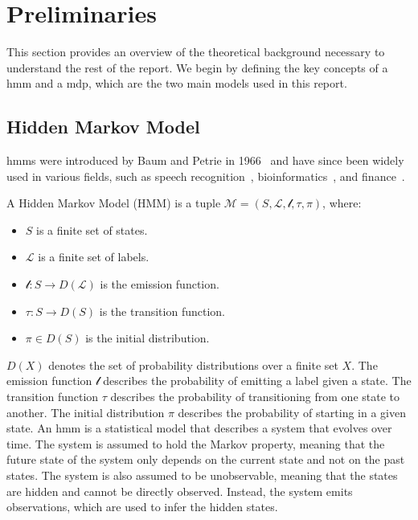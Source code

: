 \section{Preliminaries}\label{sec:preliminaries}
This section provides an overview of the theoretical background necessary to understand the rest of the report. 
We begin by defining the key concepts of a \gls{hmm} and a \gls{mdp}, which are the two main models used in this report.


\subsection{Hidden Markov Model}\label{subsec:hmm}
\glspl{hmm} were introduced by Baum and Petrie in 1966~\cite{NOTFOUND} and have since been widely used in various fields, such as speech recognition~\cite{NOTFOUND}, bioinformatics~\cite{NOTFOUND}, and finance~\cite{NOTFOUND}.
\begin{definition}
    A Hidden Markov Model (HMM) is a tuple $\mathcal{M} = (S, \mathcal{L}, \mathscr{l}, \tau,  \pi)$, where:
    \begin{itemize}
        \item $S$ is a finite set of states.
        \item $\mathcal{L}$ is a finite set of labels.
        \item $\mathscr{l}: S \rightarrow D(\mathcal{L})$ is the emission function.
        \item $\tau: S \rightarrow D(S)$ is the transition function.
        \item $\pi \in D(S)$ is the initial distribution.
    \end{itemize}
\end{definition}

$D(X)$ denotes the set of probability distributions over a  finite set $X$.
The emission function $\mathscr{l}$ describes the probability of emitting a label given a state.
The transition function $\tau$ describes the probability of transitioning from one state to another.
The initial distribution $\pi$ describes the probability of starting in a given state.
An \gls{hmm} is a statistical model that describes a system that evolves over time.
The system is assumed to hold the Markov property, meaning that the future state of the system only depends on the current state and not on the past states.
The system is also assumed to be unobservable, meaning that the states are hidden and cannot be directly observed.
Instead, the system emits observations, which are used to infer the hidden states.

